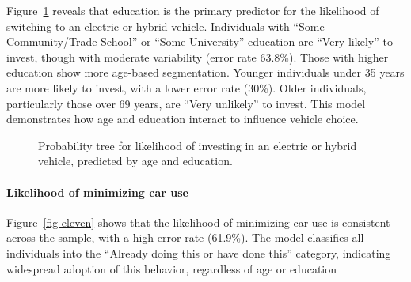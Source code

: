 \documentclass[
  letterpaper,
  DIV=11,
  numbers=noendperiod]{scrartcl}
\let\oldparagraph\paragraph
\renewcommand{\paragraph}[1]{\oldparagraph{#1}\mbox{}}
\begin{document}
Figure~\ref{fig-ten} reveals that education is the primary predictor for
the likelihood of switching to an electric or hybrid vehicle.
Individuals with ``Some Community/Trade School'' or ``Some University''
education are ``Very likely'' to invest, though with moderate
variability (error rate 63.8\%). Those with higher education show more
age-based segmentation. Younger individuals under 35 years are more
likely to invest, with a lower error rate (30\%). Older individuals,
particularly those over 69 years, are ``Very unlikely'' to invest. This
model demonstrates how age and education interact to influence vehicle
choice.

\begin{figure}


\caption{\label{fig-ten}Probability tree for likelihood of investing in
an electric or hybrid vehicle, predicted by age and education.}

\end{figure}%

\paragraph{Likelihood of minimizing car
use}\label{likelihood-of-minimizing-car-use}

Figure~\ref{fig-eleven} shows that the likelihood of minimizing car use
is consistent across the sample, with a high error rate (61.9\%). The
model classifies all individuals into the ``Already doing this or have
done this'' category, indicating widespread adoption of this behavior,
regardless of age or education
\end{document}
